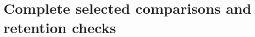 \section{Complete selected comparisons and retention checks}\label{app:comparisons}

\FloatBarrier

\FloatBarrier

\FloatBarrier


